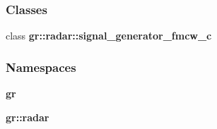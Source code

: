 \subsubsection*{Classes}
\begin{DoxyCompactItemize}
\item 
class {\bf gr\+::radar\+::signal\+\_\+generator\+\_\+fmcw\+\_\+c}
\end{DoxyCompactItemize}
\subsubsection*{Namespaces}
\begin{DoxyCompactItemize}
\item 
 {\bf gr}
\item 
 {\bf gr\+::radar}
\end{DoxyCompactItemize}
